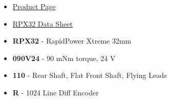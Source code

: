 \documentclass[10pt]{article}
\begin{document}
			\begin{itemize}
                \item \href{https://www.electrocraft.com/products/bldc/RPX32/}{Product Page}
                \item \href{../RPX32-DataSheet-US.pdf}{RPX32 Data Sheet}
            \end{itemize}
			\begin{itemize}
				\item \textbf{RPX32} - RapidPower Xtreme 32mm
				\item \textbf{090V24} - 90 mNm torque, 24 V
				\item \textbf{110} - Rear Shaft, Flat Front Shaft, Flying Leads
				\item \textbf{R} - 1024 Line Diff Encoder
			\end{itemize}
		
\end{document}
